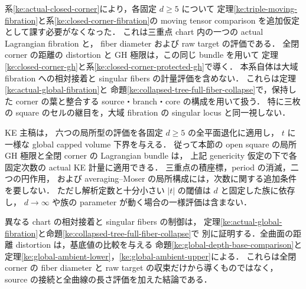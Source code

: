 \begin{remark}
\label{ke:actual-closed-corner-scope}
系\ref{ke:actual-closed-corner}により，各固定 $d\ge5$ について
定理\ref{ke:triple-moving-fibration}と系\ref{ke:closed-corner-fibration}の
moving tensor comparison を追加仮定として課す必要がなくなった．
これは三重点 chart 内の一つの actual Lagrangian fibration と，
fiber diameter および raw target の評価である．
全閉 corner の距離の distortion と GH 極限は，この同じ bundle を用いて
定理\ref{ke:closed-corner-gh}と系\ref{ke:closed-corner-protected-gh}で導く．
本系自体は大域 fibration への相対接着と singular fibers の計量評価を含めない．
これらは定理\ref{ke:actual-global-fibration}と
命題\ref{ke:collapsed-tree-full-fiber-collapse}で，保持した corner の葉と整合する
source・branch・core の構成を用いて扱う．
特に三枚の square のセルの継目を，大域 fibration の singular locus と同一視しない．
\end{remark}

\begin{remark}[次数依存と全域定理への適用]
\label{ke:open-cell-general-degree}
KE 主稿\cite[Part~IV, \texttt{coarse:cor:degree-d-volume-lower}]{KELocalCurrent}は，
六つの局所型の評価を各固定 $d\ge5$ の全平面退化に適用し，
$t$ に一様な global capped volume 下界を与える．
従って本節の open square の局所 GH 極限と全閉 corner の Lagrangian bundle は，
上記 genericity 仮定の下で各固定次数の actual KE 計量に適用できる．
三重点の積座標，period の消滅，二つの円作用，
および averaging--Moser の局所構成には，次数に関する追加条件を要しない．
ただし解析定数と十分小さい $|t|$ の閾値は $d$ と固定した族に依存し，
$d\to\infty$ や族の parameter が動く場合の一様評価は含まない．

異なる chart の相対接着と singular fibers の制御は，
定理\ref{ke:actual-global-fibration}と命題\ref{ke:collapsed-tree-full-fiber-collapse}で
別に証明する．全曲面の距離 distortion は，基底値の比較を与える
命題\ref{ke:global-depth-base-comparison}と
定理\ref{ke:global-ambient-lower}，\ref{ke:global-ambient-upper}による．
これらは全閉 corner の fiber diameter と raw target の収束だけから導くものではなく，
source の接続と全曲線の長さ評価を加えた結論である．
\end{remark}
